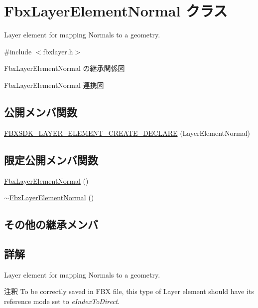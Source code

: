 \hypertarget{class_fbx_layer_element_normal}{}\section{Fbx\+Layer\+Element\+Normal クラス}
\label{class_fbx_layer_element_normal}


Layer element for mapping Normals to a geometry.  




{\ttfamily \#include $<$fbxlayer.\+h$>$}



Fbx\+Layer\+Element\+Normal の継承関係図


Fbx\+Layer\+Element\+Normal 連携図
\subsection*{公開メンバ関数}
\begin{DoxyCompactItemize}
\item 
\hyperlink{class_fbx_layer_element_normal_a5528c5cfd22f39e2b94fe852c911fbb1}{F\+B\+X\+S\+D\+K\+\_\+\+L\+A\+Y\+E\+R\+\_\+\+E\+L\+E\+M\+E\+N\+T\+\_\+\+C\+R\+E\+A\+T\+E\+\_\+\+D\+E\+C\+L\+A\+RE} (Layer\+Element\+Normal)
\end{DoxyCompactItemize}
\subsection*{限定公開メンバ関数}
\begin{DoxyCompactItemize}
\item 
\hyperlink{class_fbx_layer_element_normal_a08287396add8d7dc98695be459a7697b}{Fbx\+Layer\+Element\+Normal} ()
\item 
\hyperlink{class_fbx_layer_element_normal_abd0cbe65ec982e7486de222a99a8089d}{$\sim$\+Fbx\+Layer\+Element\+Normal} ()
\end{DoxyCompactItemize}
\subsection*{その他の継承メンバ}


\subsection{詳解}
Layer element for mapping Normals to a geometry. 

\begin{DoxyRemark}{注釈}
To be correctly saved in F\+BX file, this type of Layer element should have its reference mode set to {\itshape e\+Index\+To\+Direct}. 
\end{DoxyRemark}


